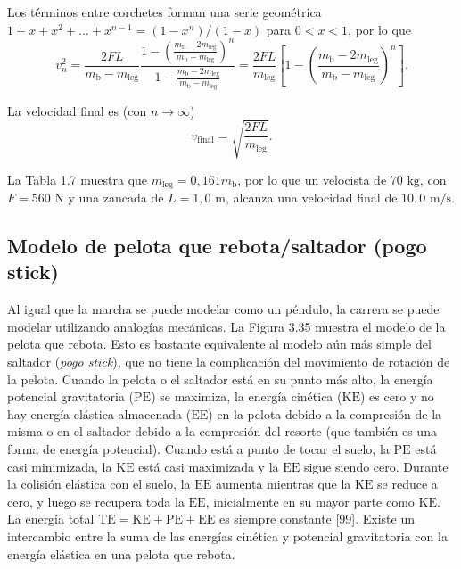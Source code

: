 \documentclass[12pt]{book}
\begin{document}
Los términos entre corchetes forman una serie geométrica $1 + x + x^2 + \dots + x^{n-1} = (1 - x^n)/(1 - x)$ para $0 < x < 1$, por lo que
\begin{equation}
v_n^2 = \frac{2FL}{m_{\text{b}} - m_{\text{leg}}} \frac{1 - \left( \frac{m_{\text{b}} - 2m_{\text{leg}}}{m_{\text{b}} - m_{\text{leg}}} \right)^n}{1 - \frac{m_{\text{b}} - 2m_{\text{leg}}}{m_{\text{b}} - m_{\text{leg}}}} = \frac{2FL}{m_{\text{leg}}} \left[ 1 - \left( \frac{m_{\text{b}} - 2m_{\text{leg}}}{m_{\text{b}} - m_{\text{leg}}} \right)^n \right].
\label{eq:3.46}
\end{equation}

La velocidad final es (con $n \to \infty$)
\begin{equation}
v_{\text{final}} = \sqrt{\frac{2FL}{m_{\text{leg}}}}.
\label{eq:3.47}
\end{equation}

La Tabla 1.7 muestra que $m_{\text{leg}} = 0,161 m_{\text{b}}$, por lo que un velocista de $70\text{ kg}$, con $F = 560\text{ N}$ y una zancada de $L = 1,0\text{ m}$, alcanza una velocidad final de $10,0\text{ m/s}$.

\subsection{Modelo de pelota que rebota/saltador (pogo stick)}

Al igual que la marcha se puede modelar como un péndulo, la carrera se puede modelar utilizando analogías mecánicas. La Figura 3.35 muestra el modelo de la pelota que rebota. Esto es bastante equivalente al modelo aún más simple del saltador (\textit{pogo stick}), que no tiene la complicación del movimiento de rotación de la pelota. Cuando la pelota o el saltador está en su punto más alto, la energía potencial gravitatoria ($\text{PE}$) se maximiza, la energía cinética ($\text{KE}$) es cero y no hay energía elástica almacenada ($\text{EE}$) en la pelota debido a la compresión de la misma o en el saltador debido a la compresión del resorte (que también es una forma de energía potencial). Cuando está a punto de tocar el suelo, la $\text{PE}$ está casi minimizada, la $\text{KE}$ está casi maximizada y la $\text{EE}$ sigue siendo cero. Durante la colisión elástica con el suelo, la $\text{EE}$ aumenta mientras que la $\text{KE}$ se reduce a cero, y luego se recupera toda la $\text{EE}$, inicialmente en su mayor parte como $\text{KE}$. La energía total $\text{TE} = \text{KE} + \text{PE} + \text{EE}$ es siempre constante [99]. Existe un intercambio entre la suma de las energías cinética y potencial gravitatoria con la energía elástica en una pelota que rebota.
\end{document}
